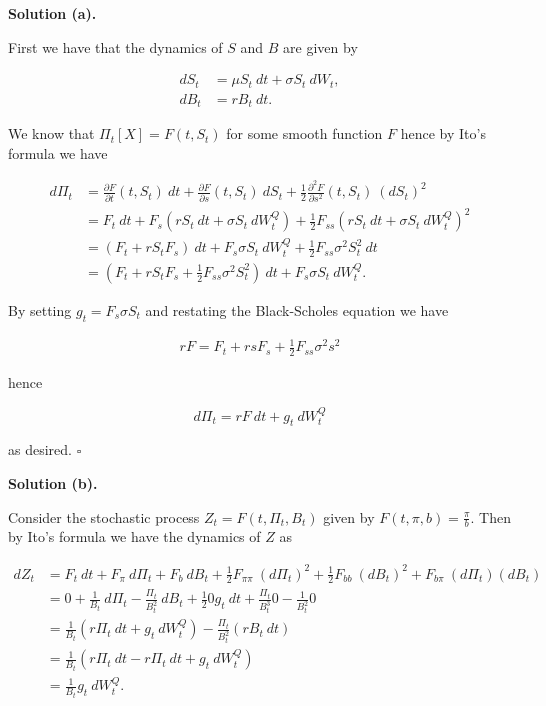 \documentclass[
]{book}
\begin{document}
\textbf{Solution (a).}

First we have that the dynamics of \(S\) and \(B\) are given by

\begin{align*}
dS_t&=\mu S_t\ dt + \sigma S_t\ dW_t,\\
dB_t&=rB_t\ dt.
\end{align*}

We know that \(\Pi_t[X]=F(t,S_t)\) for some smooth function \(F\) hence by Ito's formula we have

\begin{align*}
d\Pi_t&=\frac{\partial F}{\partial t}(t,S_t)\ dt +\frac{\partial F}{\partial s}(t,S_t)\ dS_t+\frac{1}{2}\frac{\partial^2 F}{\partial s^2}(t,S_t)\ (dS_t)^2\\
&=F_t\ dt+F_s(r S_t\ dt + \sigma S_t\ dW^Q_t)+\frac{1}{2}F_{ss}(r S_t\ dt + \sigma S_t\ dW^Q_t)^2\\
&=(F_t+r S_t F_s)\ dt+F_s\sigma S_t\ dW^Q_t+\frac{1}{2}F_{ss}\sigma ^2S_t^2\ dt\\
&=(F_t+r S_tF_s+\frac{1}{2}F_{ss}\sigma ^2S_t^2)\ dt+F_s\sigma S_t\ dW^   Q_t.
\end{align*}

By setting \(g_t=F_s\sigma S_t\) and restating the Black-Scholes equation we have

\begin{align*}
rF=F_t+rsF_s+\frac{1}{2}F_{ss}\sigma ^2 s^2
\end{align*}

hence

\[
d\Pi_t=r F\ dt+g_t\ dW^Q_t
\]

as desired. \(\square\)

\textbf{Solution (b).}

Consider the stochastic process \(Z_t=F(t,\Pi_t,B_t)\) given by \(F(t,\pi,b)=\frac{\pi}{b}\). Then by Ito's formula we have the dynamics of \(Z\) as

\begin{align*}
dZ_t&=F_t\ dt+F_\pi\ d\Pi_t+F_b\ dB_t+\frac{1}{2}F_{\pi\pi}\ (d\Pi_t)^2+\frac{1}{2}F_{bb}\ (dB_t)^2+F_{b\pi}\ (d\Pi_t)(dB_t)\\
&=0+\frac{1}{B_t}\ d\Pi_t-\frac{\Pi_t}{B_t^2}\ dB_t+\frac{1}{2}0g_t\ dt+\frac{\Pi_t}{B_t^3}0-\frac{1}{B_t^2}0\\
&=\frac{1}{B_t}(r \Pi_t\ dt + g_t\ dW^Q_t)-\frac{\Pi_t}{B_t^2}(rB_t\ dt)\\
&=\frac{1}{B_t}(r\Pi_t\ dt-r\Pi_t\ dt+g_t\ dW_t^Q)\\
&=\frac{1}{B_t}g_t\ dW_t^Q.
\end{align*}
\end{document}
